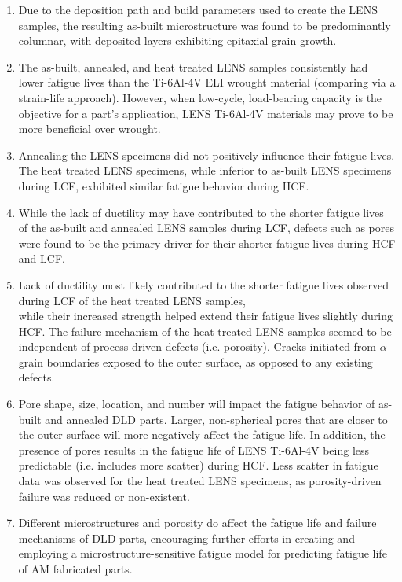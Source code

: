 \documentclass[10pt]{article}
\begin{document}
\begin{enumerate}
  \item Due to the deposition path and build parameters used to create the LENS samples, the resulting as-built microstructure was found to be predominantly columnar, with deposited layers exhibiting epitaxial grain growth.

  \item The as-built, annealed, and heat treated LENS samples consistently had lower fatigue lives than the Ti-6Al-4V ELI wrought material (comparing via a strain-life approach). However, when low-cycle, load-bearing capacity is the objective for a part's application, LENS Ti-6Al-4V materials may prove to be more beneficial over wrought.

  \item Annealing the LENS specimens did not positively influence their fatigue lives. The heat treated LENS specimens, while inferior to as-built LENS specimens during LCF, exhibited similar fatigue behavior during HCF.

  \item While the lack of ductility may have contributed to the shorter fatigue lives of the as-built and annealed LENS samples during LCF, defects such as pores were found to be the primary driver for their shorter fatigue lives during HCF and LCF.

  \item Lack of ductility most likely contributed to the shorter fatigue lives observed during LCF of the heat treated LENS samples,\\
while their increased strength helped extend their fatigue lives slightly during HCF. The failure mechanism of the heat treated LENS samples seemed to be independent of process-driven defects (i.e. porosity). Cracks initiated from $\alpha$ grain boundaries exposed to the outer surface, as opposed to any existing defects.

  \item Pore shape, size, location, and number will impact the fatigue behavior of as-built and annealed DLD parts. Larger, non-spherical pores that are closer to the outer surface will more negatively affect the fatigue life. In addition, the presence of pores results in the fatigue life of LENS Ti-6Al-4V being less predictable (i.e. includes more scatter) during HCF. Less scatter in fatigue data was observed for the heat treated LENS specimens, as porosity-driven failure was reduced or non-existent.

  \item Different microstructures and porosity do affect the fatigue life and failure mechanisms of DLD parts, encouraging further efforts in creating and employing a microstructure-sensitive fatigue model for predicting fatigue life of AM fabricated parts.

\end{enumerate}
\end{document}
